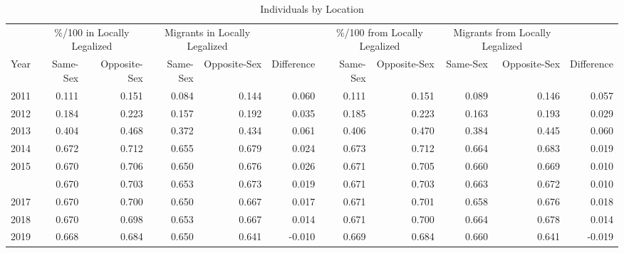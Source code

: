 \begin{table}

\caption{Individuals by Location}
\centering
\begin{tabular}[t]{rrrrrrrrrrr}
\toprule
\multicolumn{1}{c}{ } & \multicolumn{2}{c}{\%/100 in Locally Legalized} & \multicolumn{2}{c}{Migrants in Locally Legalized} & \multicolumn{1}{c}{ } & \multicolumn{2}{c}{\%/100 from Locally Legalized} & \multicolumn{2}{c}{Migrants from Locally Legalized} & \multicolumn{1}{c}{ } \\
\cmidrule(l{3pt}r{3pt}){2-3} \cmidrule(l{3pt}r{3pt}){4-5} \cmidrule(l{3pt}r{3pt}){7-8} \cmidrule(l{3pt}r{3pt}){9-10}
Year & Same-Sex & Opposite-Sex & Same-Sex & Opposite-Sex & Difference & Same-Sex & Opposite-Sex & Same-Sex & Opposite-Sex & Difference\\
\midrule
2011 & 0.111 & 0.151 & 0.084 & 0.144 & 0.060 & 0.111 & 0.151 & 0.089 & 0.146 & 0.057\\
2012 & 0.184 & 0.223 & 0.157 & 0.192 & 0.035 & 0.185 & 0.223 & 0.163 & 0.193 & 0.029\\
2013 & 0.404 & 0.468 & 0.372 & 0.434 & 0.061 & 0.406 & 0.470 & 0.384 & 0.445 & 0.060\\
2014 & 0.672 & 0.712 & 0.655 & 0.679 & 0.024 & 0.673 & 0.712 & 0.664 & 0.683 & 0.019\\
2015 & 0.670 & 0.706 & 0.650 & 0.676 & 0.026 & 0.671 & 0.705 & 0.660 & 0.669 & 0.010\\
\addlinespace
2016 & 0.670 & 0.703 & 0.653 & 0.673 & 0.019 & 0.671 & 0.703 & 0.663 & 0.672 & 0.010\\
2017 & 0.670 & 0.700 & 0.650 & 0.667 & 0.017 & 0.671 & 0.701 & 0.658 & 0.676 & 0.018\\
2018 & 0.670 & 0.698 & 0.653 & 0.667 & 0.014 & 0.671 & 0.700 & 0.664 & 0.678 & 0.014\\
2019 & 0.668 & 0.684 & 0.650 & 0.641 & -0.010 & 0.669 & 0.684 & 0.660 & 0.641 & -0.019\\
\bottomrule
\end{tabular}
\end{table}
